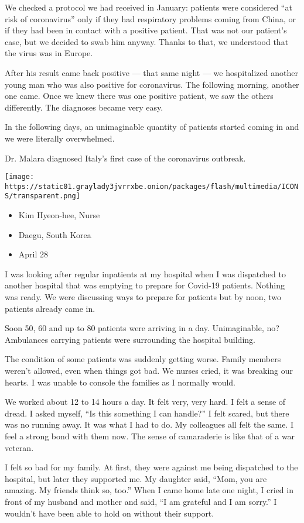 We checked a protocol we had received in January: patients were
considered ``at risk of coronavirus'' only if they had respiratory
problems coming from China, or if they had been in contact with a
positive patient. That was not our patient's case, but we decided to
swab him anyway. Thanks to that, we understood that the virus was in
Europe.

After his result came back positive --- that same night --- we
hospitalized another young man who was also positive for coronavirus.
The following morning, another one came. Once we knew there was one
positive patient, we saw the others differently. The diagnoses became
very easy.

In the following days, an unimaginable quantity of patients started
coming in and we were literally overwhelmed.

Dr. Malara diagnosed Italy's first case of the coronavirus outbreak.

\texttt{[image: https://static01.graylady3jvrrxbe.onion/packages/flash/multimedia/ICONS/transparent.png]}

\begin{itemize}
\tightlist
\item
  Kim Hyeon-hee, Nurse
\item
  Daegu, South Korea
\item
  April 28
\end{itemize}

I was looking after regular inpatients at my hospital when I was
dispatched to another hospital that was emptying to prepare for Covid-19
patients. Nothing was ready. We were discussing ways to prepare for
patients but by noon, two patients already came in.

Soon 50, 60 and up to 80 patients were arriving in a day. Unimaginable,
no? Ambulances carrying patients were surrounding the hospital building.

The condition of some patients was suddenly getting worse. Family
members weren't allowed, even when things got bad. We nurses cried, it
was breaking our hearts. I was unable to console the families as I
normally would.

We worked about 12 to 14 hours a day. It felt very, very hard. I felt a
sense of dread. I asked myself, ``Is this something I can handle?'' I
felt scared, but there was no running away. It was what I had to do. My
colleagues all felt the same. I feel a strong bond with them now. The
sense of camaraderie is like that of a war veteran.

I felt so bad for my family. At first, they were against me being
dispatched to the hospital, but later they supported me. My daughter
said, ``Mom, you are amazing. My friends think so, too.'' When I came
home late one night, I cried in front of my husband and mother and said,
``I am grateful and I am sorry.'' I wouldn't have been able to hold on
without their support.

